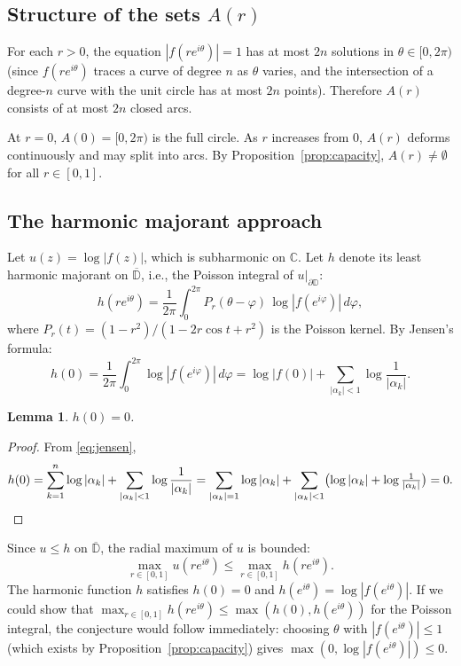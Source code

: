 \documentclass[11pt]{article}
\newtheorem{lemma}[theorem]{Lemma}
\theoremstyle{definition}
\theoremstyle{remark}
\begin{document}
\subsection{Structure of the sets $A(r)$}

For each $r>0$, the equation $|f(re^{i\theta})|=1$ has at most $2n$ solutions in $\theta\in[0,2\pi)$ (since $f(re^{i\theta})$ traces a curve of degree $n$ as $\theta$ varies, and the intersection of a degree-$n$ curve with the unit circle has at most $2n$ points). Therefore $A(r)$ consists of at most $2n$ closed arcs.

At $r=0$, $A(0)=[0,2\pi)$ is the full circle. As $r$ increases from $0$, $A(r)$ deforms continuously and may split into arcs. By Proposition~\ref{prop:capacity}, $A(r)\neq\emptyset$ for all $r\in[0,1]$.

\subsection{The harmonic majorant approach}

Let $u(z)=\log|f(z)|$, which is subharmonic on $\mathbb{C}$. Let $h$ denote its least harmonic majorant on $\overline{\mathbb{D}}$, i.e., the Poisson integral of $u|_{\partial\mathbb{D}}$:
\[
h(re^{i\theta}) = \frac{1}{2\pi}\int_0^{2\pi} P_r(\theta-\varphi)\,\log|f(e^{i\varphi})|\,d\varphi,
\]
where $P_r(t) = (1-r^2)/(1-2r\cos t + r^2)$ is the Poisson kernel. By Jensen's formula:
\begin{equation}\label{eq:jensen}
h(0) = \frac{1}{2\pi}\int_0^{2\pi}\log|f(e^{i\varphi})|\,d\varphi = \log|f(0)| + \sum_{|\alpha_k|<1}\log\frac{1}{|\alpha_k|}.
\end{equation}

\begin{lemma}\label{lem:h0}
$h(0)=0$.
\end{lemma}

\begin{proof}
From \eqref{eq:jensen},
\[
h(0) = \sum_{k=1}^n\log|\alpha_k| + \sum_{|\alpha_k|<1}\log\frac{1}{|\alpha_k|} = \sum_{|\alpha_k|=1}\log|\alpha_k| + \sum_{|\alpha_k|<1}\bigl(\log|\alpha_k|+\log\tfrac{1}{|\alpha_k|}\bigr) = 0.\qedhere
\]
\end{proof}

Since $u\leq h$ on $\overline{\mathbb{D}}$, the radial maximum of $u$ is bounded:
\[
\max_{r\in[0,1]} u(re^{i\theta}) \leq \max_{r\in[0,1]} h(re^{i\theta}).
\]
The harmonic function $h$ satisfies $h(0)=0$ and $h(e^{i\theta})=\log|f(e^{i\theta})|$. If we could show that $\max_{r\in[0,1]}h(re^{i\theta})\leq\max(h(0),h(e^{i\theta}))$ for the Poisson integral, the conjecture would follow immediately: choosing $\theta$ with $|f(e^{i\theta})|\leq 1$ (which exists by Proposition~\ref{prop:capacity}) gives $\max(0,\log|f(e^{i\theta})|)\leq 0$.
\end{document}
